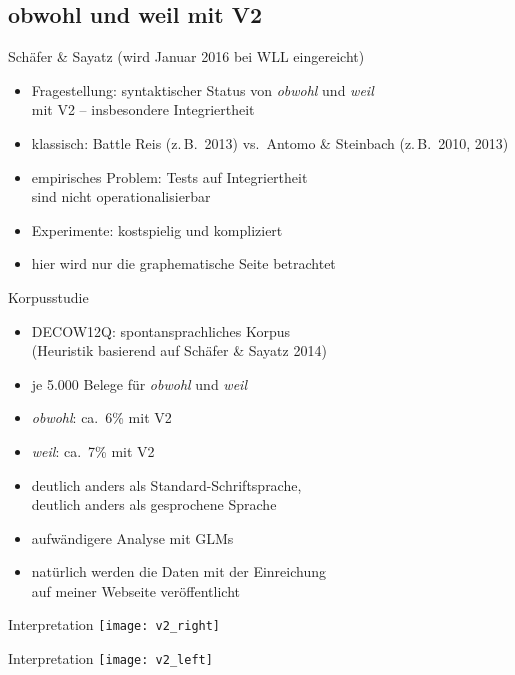\subsection{obwohl und weil mit V2}

\begin{frame}
	{Schäfer \& Sayatz (wird Januar 2016 bei WLL eingereicht)}
	\begin{itemize}
	  \item Fragestellung: syntaktischer Status von \textit{obwohl} und \textit{weil}\\mit V2 -- insbesondere \alert{Integriertheit}
	  \item klassisch: Battle Reis (z.\,B.\ 2013) vs.\ Antomo \& Steinbach (z.\,B.\ 2010, 2013)
	  \item empirisches Problem: Tests auf Integriertheit\\sind nicht operationalisierbar
	  \item Experimente: kostspielig und kompliziert
	  \item hier wird nur die \alert{graphematische Seite} betrachtet
	\end{itemize}
\end{frame}

\begin{frame}
	{Korpusstudie}
	\begin{itemize}
		\item DECOW12Q: spontansprachliches Korpus\\(Heuristik basierend auf Schäfer \& Sayatz 2014)
		\item je 5.000 Belege für \textit{obwohl} und \textit{weil}
		\item \textit{obwohl}: ca.\ 6\% mit V2
		\item \textit{weil}: ca.\ 7\% mit V2
		\item deutlich anders als Standard-Schriftsprache,\\deutlich anders als gesprochene Sprache
		\item aufwändigere Analyse mit GLMs
		\item \alert{natürlich} werden die Daten mit der Einreichung\\auf meiner Webseite veröffentlicht
	\end{itemize}
\end{frame}

\begin{frame}
	{Interpretation}
	\centering
	\texttt{[image: v2\_right]}
\end{frame}

\begin{frame}
	{Interpretation}
	\centering
	\texttt{[image: v2\_left]}
\end{frame}

